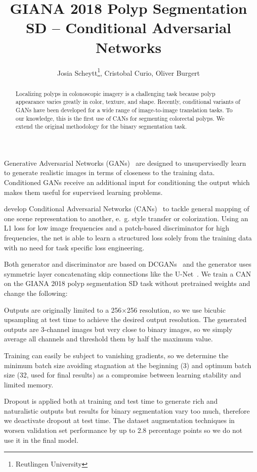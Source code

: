 \documentclass[12pt]{article}
\title{GIANA 2018 Polyp Segmentation SD -- Conditional Adversarial Networks}
\author{Josia Scheytt\thanks{Reutlingen University}, Cristobal Curio\footnotemark[1], Oliver Burgert\footnotemark[1]}
\begin{document}
\maketitle

\begin{abstract}
Localizing polyps in colonoscopic imagery is a challenging task because polyp appearance varies greatly in color, texture, and shape.
Recently, conditional variants of GANs have been developed for a wide range of image-to-image translation tasks.
To our knowledge, this is the first use of CANs for segmenting colorectal polyps.
We extend the original methodology for the binary segmentation task.
\end{abstract}

Generative Adversarial Networks (GANs)~\cite{Goodfellow.2014} are designed to unsupervisedly learn to generate realistic images in terms of closeness to the training data.
Conditioned GANs receive an additional input for conditioning the output which makes them useful for supervised learning problems.

\citeauthor{Isola.2017} develop Conditional Adversarial Networks (CANs)~\cite{Isola.2017} to tackle general mapping of one scene representation to another, e.~g. style transfer or colorization.
Using an L1 loss for low image frequencies and a patch-based discriminator for high frequencies, the net is able to learn a structured loss solely from the training data with no need for task specific loss engineering.

Both generator and discriminator are based on DCGANs~\cite{Radford.2016} and the generator uses symmetric layer concatenating skip connections like the U-Net~\cite{Ronneberger.2015}.
We train a CAN on the GIANA 2018 polyp segmentation SD task without pretrained weights and change the following:

Outputs are originally limited to a 256$\times$256 resolution, so we use bicubic upsampling at test time to achieve the desired output resolution.
The generated outputs are 3-channel images but very close to binary images, so we simply average all channels and threshold them by half the maximum value.

Training can easily be subject to vanishing gradients, so we determine the minimum batch size avoiding stagnation at the beginning (3) and optimum batch size (32, used for final results) as a compromise between learning stability and limited memory.

Dropout is applied both at training and test time to generate rich and naturalistic outputs but results for binary segmentation vary too much, therefore we deactivate dropout at test time.
The dataset augmentation techniques in \cite{Vazquez.2017} worsen validation set performance by up to 2.8 percentage points so we do not use it in the final model.

\printbibliography
\end{document}
